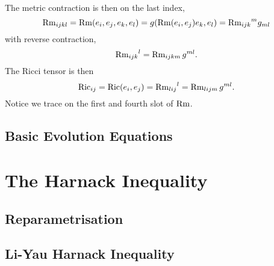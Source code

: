 \documentclass{amsart}
\begin{document}
The metric contraction is then on the last index,
\[
\operatorname{Rm}_{ijkl} = \operatorname{Rm}(e_i, e_j, e_k, e_l) = g(\operatorname{Rm}(e_i, e_j) e_k, e_l) = {\operatorname{Rm}_{ijk}}^mg_{ml}
\]
with reverse contraction,
\[
{\operatorname{Rm}_{ijk}}^l = \operatorname{Rm}_{ijkm} g^{ml}.
\]
The Ricci tensor is then
\[
\operatorname{Ric}_{ij} = \operatorname{Ric}(e_i, e_j) = {\operatorname{Rm}_{lij}}^l = \operatorname{Rm}_{lijm} g^{ml}.
\]
Notice we trace on the first and fourth slot of \(\operatorname{Rm}\).

\subsection{Basic Evolution Equations}
\label{subsec:evolution}

\section{The Harnack Inequality}
\label{sec:harnack}

\subsection{Reparametrisation}
\label{subsec:harnack_reparam}

\subsection{Li-Yau Harnack Inequality}
\label{subsec:harnack_liyau}
\end{document}
